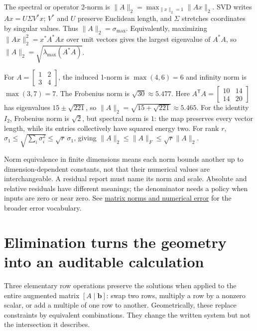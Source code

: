 The spectral or operator 2-norm is \(\|A\|_2=\max_{\|x\|_2=1}\|Ax\|_2\). SVD writes \(Ax=U\Sigma V^*x\); \(V^*\) and \(U\) preserve Euclidean length, and \(\Sigma\) stretches coordinates by singular values. Thus \(\|A\|_2=\sigma_{\max}\). Equivalently, maximizing \(\|Ax\|_2^2=x^*A^*Ax\) over unit vectors gives the largest eigenvalue of \(A^*A\), so \(\|A\|_2=\sqrt{\lambda_{\max}(A^*A)}\).

For \(A=\begin{bmatrix}1&2\\3&4\end{bmatrix}\), the induced 1-norm is \(\max(4,6)=6\) and infinity norm is \(\max(3,7)=7\). The Frobenius norm is \(\sqrt{30}\approx5.477\). Here \(A^\mathsf TA=\begin{bmatrix}10&14\\14&20\end{bmatrix}\) has eigenvalues \(15\pm\sqrt{221}\), so \(\|A\|_2=\sqrt{15+\sqrt{221}}\approx5.465\). For the identity \(I_2\), Frobenius norm is \(\sqrt2\), but spectral norm is \(1\): the map preserves every vector length, while its entries collectively have squared energy two. For rank \(r\), \(\sigma_1\le\sqrt{\sum_i\sigma_i^2}\le\sqrt r\,\sigma_1\), giving \(\|A\|_2\le\|A\|_F\le\sqrt r\|A\|_2\).

Norm equivalence in finite dimensions means each norm bounds another up to dimension-dependent constants, not that their numerical values are interchangeable. A residual report must name its norm and scale. Absolute and relative residuals have different meanings; the denominator needs a policy when inputs are zero or near zero. See \hyperref[01-foundations-i-ch019-matrix-norms-put-scale-into-error-statements]{matrix norms and numerical error} for the broader error vocabulary.

\section{Elimination turns the geometry into an auditable calculation}\label{01-foundations-i-ch019-elimination-turns-the-geometry-into-an-auditable-calculation}

Three elementary row operations preserve the solutions when applied to the entire augmented matrix \([A\mid\mathbf b]\): swap two rows, multiply a row by a nonzero scalar, or add a multiple of one row to another. Geometrically, these replace constraints by equivalent combinations. They change the written system but not the intersection it describes.

